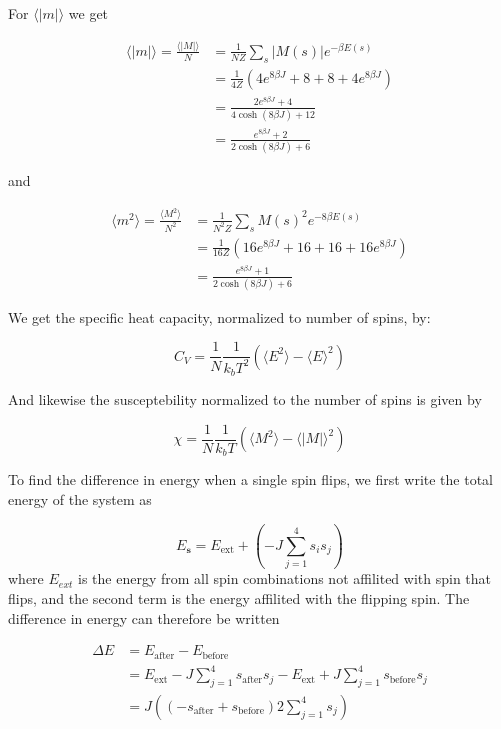 \documentclass[english,notitlepage,reprint,nofootinbib]{revtex4-1}  %
\begin{document}
For $\langle|m|\rangle$ we get

\begin{align*}
    \langle|m|\rangle  = \frac{\langle|M|\rangle}{N} &= \frac{1}{N Z} \sum\limits_{s} |M(s)| e^{- \beta E(s)} \\
    &= \frac{1}{4 Z} \left( 4 e^{8 \beta J} + 8 + 8 + 4 e^{8 \beta J} \right) \\
    &= \frac{2 e^{8 \beta J}  + 4}{4 \cosh (8 \beta J) + 12} \\
    &= \frac{e^{8 \beta J}  + 2}{2 \cosh (8 \beta J) + 6}
\end{align*}

and 

\begin{align*}
    \langle m^2\rangle = \frac{\langle M^2\rangle}{N^2} &= \frac{1}{N^2 Z} \sum\limits_{s} M(s)^2 e^{-8 \beta E(s)} \\
    &= \frac{1}{16 Z} \left( 16 e^{8 \beta J} + 16 + 16 + 16 e^{8 \beta J} \right) \\
    &= \frac{e^{8 \beta J}  + 1}{2 \cosh (8 \beta J) + 6}
\end{align*}

We get the specific heat capacity, normalized to number of spins, by:

\begin{equation}
	C_V = \frac{1}{N}\frac{1}{k_bT^2}\left(\langle E^2\rangle - \langle E\rangle^2\right)
\end{equation}

And likewise the susceptebility normalized to the number of spins is given by

\begin{equation}
	\chi = \frac{1}{N}\frac{1}{k_bT}\left(\langle M^2\rangle - \langle |M|\rangle^2\right)
\end{equation}


To find the difference in energy when a single spin flips, we first write the total energy of the system as

\begin{equation}
    E_{\mathbf{s}} = E_{\text{ext}} + \left( -J \sum\limits_{j = 1}^4 s_i s_j \right)
\end{equation}
where $E_{ext}$ is the energy from all spin combinations not affilited with spin that flips, and the second term is the energy affilited with the flipping spin.
The difference in energy can therefore be written

\begin{align*}
    \Delta E &= E_{\text{after}} - E_{\text{before}} \\
    &= E_{\text{ext}} - J \sum\limits_{j = 1}^4 s_{\text{after}} s_j - E_{\text{ext}} + J \sum\limits_{j = 1}^4 s_{\text{before}} s_j \\
    &= J \left( \left( -s_ \text{after} + s_{\text{before}} \right) 2 \sum\limits_{j = 1}^4 s_j \right)
\end{align*}
\end{document}
